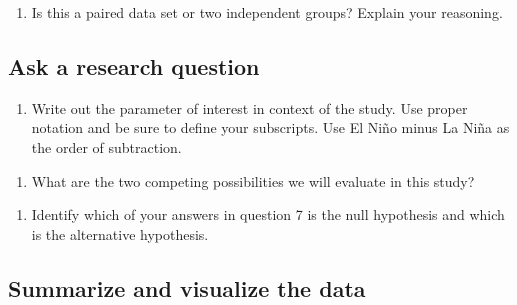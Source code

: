 \documentclass[
]{report}
\providecommand{\tightlist}{%
  \setlength{\itemsep}{0pt}\setlength{\parskip}{0pt}}
\begin{document}
\vspace{1in}

\begin{enumerate}
\def\labelenumi{\arabic{enumi}.}
\setcounter{enumi}{4}
\tightlist
\item
  Is this a paired data set or two independent groups? Explain your reasoning.
\end{enumerate}

\vspace{1in}

\hypertarget{ask-a-research-question}{%
\subsection*{Ask a research question}\label{ask-a-research-question}}

\begin{enumerate}
\def\labelenumi{\arabic{enumi}.}
\setcounter{enumi}{5}
\tightlist
\item
  Write out the parameter of interest in context of the study. Use proper notation and be sure to define your subscripts. Use El Ni\~{n}o minus La Ni\~{n}a as the order of subtraction.
\end{enumerate}

\vspace{1in}

\begin{enumerate}
\def\labelenumi{\arabic{enumi}.}
\setcounter{enumi}{6}
\tightlist
\item
  What are the two competing possibilities we will evaluate in this study?
\end{enumerate}

\vspace{1in}

\begin{enumerate}
\def\labelenumi{\arabic{enumi}.}
\setcounter{enumi}{7}
\tightlist
\item
  Identify which of your answers in question 7 is the null hypothesis and which is the alternative hypothesis.
\end{enumerate}

\vspace{1in}

\hypertarget{summarize-and-visualize-the-data}{%
\subsection*{Summarize and visualize the data}\label{summarize-and-visualize-the-data}}
\end{document}
